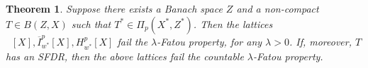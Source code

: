 \documentclass{amsart}
\theoremstyle{plain}
\newtheorem{theorem}{Theorem}[section]
\newtheorem{lemma}[theorem]{Lemma}
\theoremstyle{definition}
\numberwithin{equation}{section}
\DeclareMathOperator{\FVL}{FVL}
\DeclareMathOperator{\FBLp}{FBL^{\mathit{(p)}}}
\newcommand{\Hp}{H_{w^*}^{p}}
\newcommand{\Ip}{\overline{I}_{w^*}^{p}}
\begin{document}

\begin{theorem}\label{no compact no fatou}
Suppose there exists a Banach space $Z$ and a non-compact $T \in B(Z,X)$ such that $T^* \in \Pi_p(X^*,Z^*)$.
Then the lattices $\FBLp[X], \Ip[X], \Hp[X]$ fail the $\lambda$-Fatou property, for any $\lambda > 0$.
If, moreover, $T$ has an SFDR, then the above lattices fail the countable $\lambda$-Fatou property.
\end{theorem}
\end{document}
